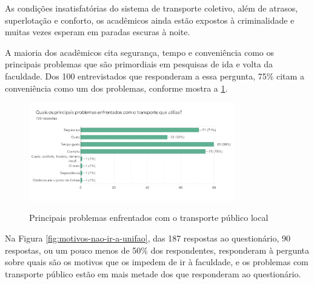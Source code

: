 As condições insatisfatórias do sistema de transporte coletivo, além de atrasos, superlotação e conforto, os acadêmicos ainda estão expostos à criminalidade e muitas vezes esperam em paradas escuras à noite.

A maioria dos acadêmicos cita segurança, tempo e conveniência como os principais problemas que são primordiais em pesquisas de ida e volta da faculdade. Dos 100 entrevistados que responderam a essa pergunta, 75\% citam a conveniência como um dos problemas, conforme mostra a \ref{fig:problemasenfrentadosparair}.

\begin{figure}[!hbtp]
	\centering
	\caption{Principais problemas enfrentados com o transporte público local}
	\includegraphics[width=0.8\textwidth]{./04-figuras/questionario/11.png}
	\label{fig:problemasenfrentadosparair}
\end{figure}


Na Figura \ref{fig:motivos-nao-ir-a-unifao}, das 187 respostas ao questionário, 90 respostas, ou um pouco menos de 50\% dos respondentes, responderam à pergunta sobre quais são os motivos que os impedem de ir à faculdade, e os problemas com transporte público estão em mais metade dos que responderam ao questionário.

